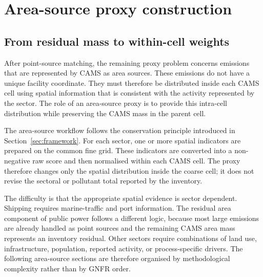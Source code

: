 \section{Area-source proxy construction}
\label{sec:area-source-proxies}

\subsection{From residual mass to within-cell weights}

After point-source matching, the remaining proxy problem concerns
emissions that are represented by CAMS as area sources. These emissions
do not have a unique facility coordinate. They must therefore be
distributed inside each CAMS cell using spatial information that is
consistent with the activity represented by the sector. The role of an
area-source proxy is to provide this intra-cell distribution while
preserving the CAMS mass in the parent cell.

The area-source workflow follows the conservation principle introduced
in Section~\ref{sec:framework}. For each sector, one or more spatial
indicators are prepared on the common fine grid. These indicators are
converted into a non-negative raw score and then normalised within each
CAMS cell. The proxy therefore changes only the spatial distribution
inside the coarse cell; it does not revise the sectoral or pollutant
total reported by the inventory.

The difficulty is that the appropriate spatial evidence is sector
dependent. Shipping requires marine-traffic and port information. The
residual area component of public power follows a different logic,
because most large emissions are already handled as point sources and
the remaining CAMS area mass represents an inventory residual. Other
sectors require combinations of land use, infrastructure, population,
reported activity, or process-specific drivers. The following area-source
sections are therefore organised by methodological complexity rather than
by GNFR order.

